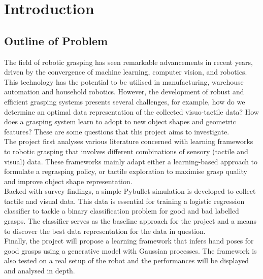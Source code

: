 \documentclass[11pt, a4paper]{report}
\theoremstyle{definition}
\begin{document}
\tableofcontents
\setcounter{page}{1}


\chapter{Introduction}
\label{chap:1}

\section{Outline of Problem}
\label{sec:1.1}
The field of robotic grasping has seen remarkable advancements in recent years, driven by the convergence of machine learning, computer vision, and robotics. This technology has the potential to be utilised in manufacturing, warehouse automation and household robotics. However, the development of robust and efficient grasping systems presents several challenges, for example, how do we determine an optimal data representation of the collected visuo-tactile data? How does a grasping system learn to adopt to new object shapes and geometric features? These are some questions that this project aims to investigate.\\

The project first analyses various literature concerned with learning frameworks to robotic grasping that involves different combinations of sensory (tactile and visual) data. These frameworks mainly adapt either a learning-based approach to formulate a regrasping policy, or tactile exploration to maximise grasp quality and improve object shape representation.\\

Backed with survey findings, a simple Pybullet simulation is developed to collect tactile and visual data. This data is essential for training a logistic regression classifier to tackle a binary classification problem for good and bad labelled grasps. The classifier serves as the baseline approach for the project and a means to discover the best data representation for the data in question.\\

Finally, the project will propose a learning framework that infers hand poses for good grasps using a generative model with Gaussian processes. The framework is also tested on a real setup of the robot and the performances will be displayed and analysed in depth.
\end{document}
